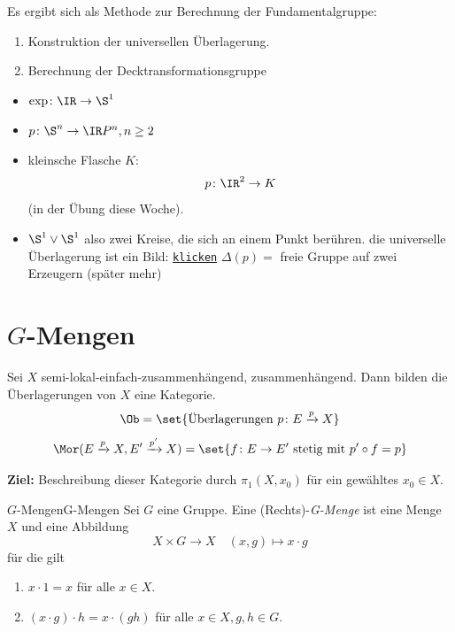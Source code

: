 \documentclass[language=ngerman]{TemplateLecture} %
\begin{document}
Es ergibt sich als Methode zur Berechnung der Fundamentalgruppe:
\begin{enumerate}
    \item Konstruktion der universellen Überlagerung.
    \item Berechnung der Decktransformationsgruppe
\end{enumerate}

\begin{example}
    \begin{itemize}
        \item \(\exp\colon \IR\to \S^1\)
        \item \(p \colon \S^n \to \IR P^n, n \geq 2\)
        \item kleinsche Flasche \(K\):
        \[p \colon \IR^2 \to K\]
        (in der Übung diese Woche).
        \item \(\S^1 \vee \S^1\) also zwei Kreise, die sich an einem Punkt berühren.
        die universelle Überlagerung ist ein Bild: \href{https://math.stackexchange.com/questions/3635211/proving-that-s1-vee-s1s-covering-space-is-universal}{\texttt{klicken}}
        \(\Delta(p) = \) freie Gruppe auf zwei Erzeugern (später mehr)
    \end{itemize}
\end{example}

\section{$G$-Mengen}

Sei \(X\) semi-lokal-einfach-zusammenhängend, zusammenhängend. Dann bilden die Überlagerungen von \(X\) eine Kategorie.
\[\Ob = \set{\text{Überlagerungen } p \colon E \xrightarrow{p} X}\]
\[\Mor(E\xrightarrow{p} X, E'\xrightarrow{p'} X) = \set{f \colon E \to E' \text{ stetig mit } p' \circ f = p}\]

\textbf{Ziel:} Beschreibung dieser Kategorie durch \(\pi_1(X,x_0)\) für ein gewähltes \(x_0 \in X\).

\begin{defi}{$G$-Mengen}{G-Mengen}
    Sei \(G\) eine Gruppe. Eine (Rechts)-\emph{G-Menge} ist eine Menge \(X\) und eine Abbildung
    \[X \times G \to X \quad (x,g) \mapsto x \cdot g\]
    für die gilt
    \begin{enumerate}
        \item \(x \cdot 1 = x\) für alle \(x \in X\).
        \item \((x \cdot g) \cdot h = x \cdot (gh) \) für alle \(x \in X, g,h \in G\).
    \end{enumerate}
\end{defi}
\end{document}

